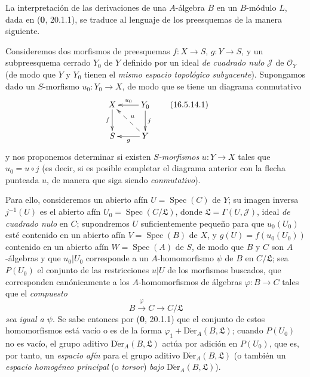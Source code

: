 \begin{env}[16.5.14]
\label{IV.16.5.14}
La interpretación de las derivaciones de una $A$-álgebra $B$ en un $B$-módulo
$L$, dada en (\textbf 0, 20.1.1), se traduce al lenguaje de los preesquemas de la
manera siguiente.

Consideremos dos morfismos de preesquemas $f:X\to S$, $g:Y\to S$, y un
subpreesquema cerrado $Y_0$ de $Y$ definido por un ideal \emph{de cuadrado nulo}
$\mathscr{J}$ de $\mathcal{O}_Y$ (de modo que $Y$ y $Y_0$ tienen el
\emph{mismo espacio topológico subyacente}). Supongamos dado un $S$-morfismo
$u_0:Y_0\to X$, de modo que se tiene un diagrama conmutativo
\[
  \xymatrix{
    X\ar[d]_-f & Y_0\ar[l]_-{u_0}\ar[d]^j\\
    S & Y\ar@{-->}[ul]_-u\ar[l]^-g
  }
  \tag{16.5.14.1}
  \label{IV.16.5.14.1}
\]
y nos proponemos determinar si existen \emph{$S$-morfismos}
$u:Y\to X$ tales que $u_0=u\circ j$ (es decir, si es posible
completar el diagrama anterior con la flecha punteada $u$, de manera que siga
siendo \emph{conmutativo}).

Para ello, consideremos un abierto afín $U=\operatorname{Spec}(C)$ de $Y$;
su imagen inversa $j^{-1}(U)$ es el abierto afín
$U_0=\operatorname{Spec}(C/\mathfrak{L})$, donde
$\mathfrak{L}=\Gamma(U,\mathscr{J})$, ideal \emph{de cuadrado nulo} en $C$;
supondremos $U$ suficientemente pequeño para que $u_0(U_0)$ esté contenido en un
abierto afín $V=\operatorname{Spec}(B)$ de $X$, y
$g(U)=f(u_0(U_0))$ contenido en un abierto afín
$W=\operatorname{Spec}(A)$ de $S$, de modo que $B$ y $C$ son
$A$-álgebras y que $u_0|U_0$ corresponde a un $A$-homomorfismo $\psi$ de
$B$ en $C/\mathfrak{L}$; sea $P(U_0)$ el conjunto de las restricciones $u|U$
de los morfismos buscados, que corresponden canónicamente a los
$A$-homomorfismos de álgebras $\varphi:B\to C$ tales que el \emph{compuesto}
\[
  B\xrightarrow{\varphi}C\longrightarrow C/\mathfrak{L}
\]
\emph{sea igual a $\psi$}. Se sabe entonces por (\textbf 0, 20.1.1) que el conjunto de estos
homomorfismos está vacío o es de la forma
$\varphi_1+\operatorname{D\acute{e}r}_A(B,\mathfrak{L})$; cuando $P(U_0)$ no es
vacío, el grupo aditivo $\operatorname{D\acute{e}r}_A(B,\mathfrak{L})$ actúa por
adición en $P(U_0)$, que es, por tanto, un \emph{espacio afín} para el grupo
aditivo $\operatorname{D\acute{e}r}_A(B,\mathfrak{L})$ (o también un
\emph{espacio homogéneo principal} (o \emph{torsor}) \emph{bajo}
$\operatorname{D\acute{e}r}_A(B,\mathfrak{L})$).


\end{env}
